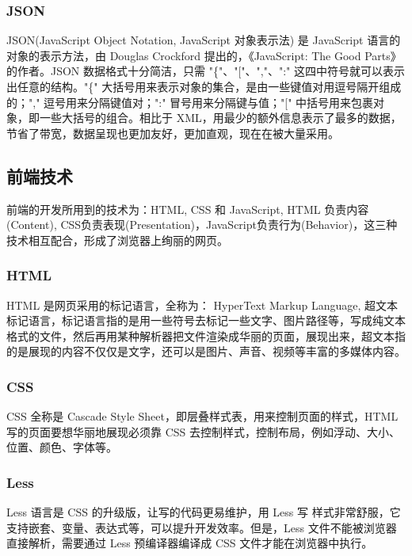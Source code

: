             \subsubsection{JSON}
              \label{subsubsec:JSON}
                JSON(JavaScript Object Notation, JavaScript 对象表示法) 是 JavaScript 语言的对象的表示方法，由 Douglas Crockford 提出的，《JavaScript: The Good Parts》的作者。JSON 数据格式十分简洁，只需 "\{"、"["、","、":" 这四中符号就可以表示出任意的结构。"\{" 大括号用来表示对象的集合，是由一些键值对用逗号隔开组成的；"," 逗号用来分隔键值对；":" 冒号用来分隔键与值；"[" 中括号用来包裹对象，即一些大括号的组合。相比于 XML，用最少的额外信息表示了最多的数据，节省了带宽，数据呈现也更加友好，更加直观，现在在被大量采用。

        \subsection{前端技术}
          \label{subsec:前端技术}
            前端的开发所用到的技术为：HTML, CSS 和 JavaScript, HTML 负责内容(Content), CSS负责表现(Presentation)，JavaScript负责行为(Behavior)，这三种技术相互配合，形成了浏览器上绚丽的网页。

            \subsubsection{HTML}
              \label{subsubsec:html}
                HTML 是网页采用的标记语言，全称为： HyperText Markup Language, 超文本标记语言，标记语言指的是用一些符号去标记一些文字、图片路径等，写成纯文本格式的文件，然后再用某种解析器把文件渲染成华丽的页面，展现出来，超文本指的是展现的内容不仅仅是文字，还可以是图片、声音、视频等丰富的多媒体内容。

            \subsubsection{CSS}
              \label{subsubsec:css}
                CSS 全称是 Cascade Style Sheet，即层叠样式表，用来控制页面的样式，HTML 写的页面要想华丽地展现必须靠 CSS 去控制样式，控制布局，例如浮动、大小、位置、颜色、字体等。

            \subsubsection{Less}
              \label{subsubsec:less}
                Less 语言是 CSS 的升级版，让写的代码更易维护，用 Less 写 样式非常舒服，它支持嵌套、变量、表达式等，可以提升开发效率。但是，Less 文件不能被浏览器直接解析，需要通过 Less 预编译器编译成 CSS 文件才能在浏览器中执行。

